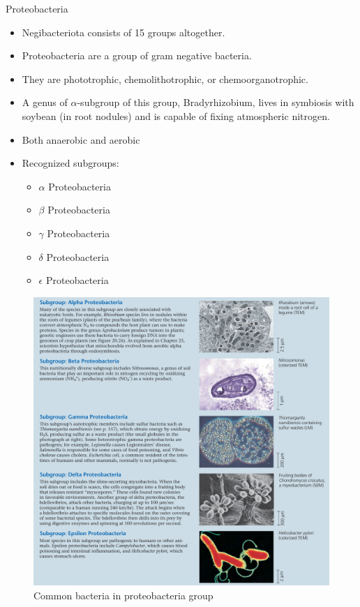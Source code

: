 \documentclass[ignorenonframetext,aspectratio=169]{beamer}
\providecommand{\tightlist}{%
  \setlength{\itemsep}{0pt}\setlength{\parskip}{0pt}}
\begin{document}
\begin{frame}{Proteobacteria}
\protect\hypertarget{proteobacteria}{}

\begin{itemize}
\tightlist
\item
  Negibacteriota consists of 15 groups altogether.
\item
  Proteobacteria are a group of gram negative bacteria.
\item
  They are phototrophic, chemolithotrophic, or chemoorganotrophic.
\item
  A genus of \(\alpha\)-subgroup of this group, Bradyrhizobium, lives in
  symbiosis with soybean (in root nodules) and is capable of fixing
  atmospheric nitrogen.
\item
  Both anaerobic and aerobic
\item
  Recognized subgroups:

  \begin{itemize}
  \tightlist
  \item
    \(\alpha\) Proteobacteria
  \item
    \(\beta\) Proteobacteria
  \item
    \(\gamma\) Proteobacteria
  \item
    \(\delta\) Proteobacteria
  \item
    \(\epsilon\) Proteobacteria
  \end{itemize}
\end{itemize}

\end{frame}

\begin{frame}{}
\protect\hypertarget{section-7}{}

\begin{figure}
\includegraphics[width=0.55\linewidth]{./../images/proteobacteria_group} \caption{Common bacteria in proteobacteria group}\label{fig:proteobacteria}
\end{figure}

\end{frame}
\end{document}
